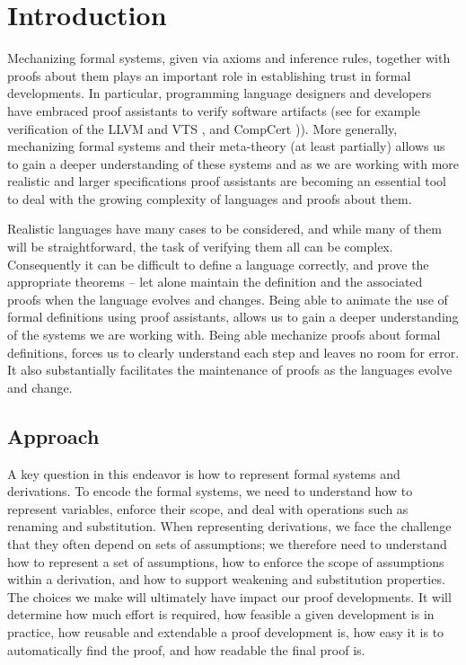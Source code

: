 \chapter{Introduction}
Mechanizing formal systems, given via axioms and inference rules, together with
proofs about them plays an important role in establishing trust in
formal developments. In particular, programming language designers and
developers have embraced proof assistants to verify software artifacts (see for example verification of the LLVM
\citep{ZhaoNMZ12} and VTS \citep{Appel11}, and CompCert
\citep{Leroy-Compcert-CACM})). More generally,  mechanizing formal systems
and their meta-theory  (at least partially) allows us to gain a deeper
understanding of these systems and as we are working with more
realistic and larger specifications proof assistants are becoming an essential
tool to deal with the growing complexity of languages and proofs about
them. %

Realistic languages have many cases to be considered, and
while many of them will be straightforward, the task of verifying them
all can be complex. Consequently it can be difficult to define a language
correctly, and prove the appropriate theorems -- let alone maintain
the definition and the associated proofs when the language evolves and
changes.  Being able to animate the use of formal definitions using
proof assistants, allows us to gain a deeper understanding of the
systems we are working with. Being able mechanize proofs about formal
definitions, forces us to clearly understand each step and leaves no
room for error.  It also substantially facilitates the maintenance of
proofs as the languages evolve and change.


\section{Approach}

A key question in this endeavor is how to represent formal systems and
derivations. To encode the formal systems, we need to understand how
to represent variables, enforce their scope, and deal with operations
such as renaming and substitution. When representing derivations, we
face the challenge that they often depend on sets of assumptions; we
therefore need to understand how to represent a set of assumptions,
how to enforce the scope of assumptions within a derivation, and how
to support weakening and substitution properties. The choices we make
will ultimately have impact our proof developments. It will determine
how much effort is required, how feasible a given development is in
practice, how reusable and extendable a proof development is, how easy
it is to automatically find the proof, and how readable the final proof is.  

